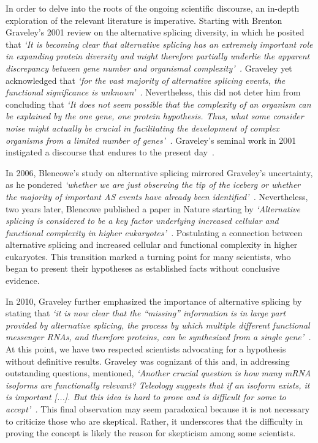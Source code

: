 In order to delve into the roots of the ongoing scientific discourse, an in-depth exploration of the relevant literature is imperative. Starting with Brenton Graveley's 2001 review on the alternative splicing diversity, in which he posited that \textit{`It is becoming clear that alternative splicing has an extremely important role in expanding protein diversity and might therefore partially underlie the apparent discrepancy between gene number and organismal complexity'~\citep{graveley_alternative_2001}.} Graveley yet acknowledged that \textit{`for the vast majority of alternative splicing events, the functional significance is unknown'~\citep{graveley_alternative_2001}.} Nevertheless, this did not deter him from concluding that \textit{`It does not seem possible that the complexity of an organism can be explained by the one gene, one protein hypothesis. Thus, what some consider noise might actually be crucial in facilitating the development of complex organisms from a limited number of genes'~\citep{graveley_alternative_2001}.} Graveley's seminal work in 2001 instigated a discourse that endures to the present day~\citep{graveley_alternative_2001}.

In 2006, Blencowe's study on alternative splicing mirrored Graveley's uncertainty, as he pondered \textit{`whether we are just observing the tip of the iceberg or whether the majority of important AS events have already been identified'~\citep{blencowe_alternative_2006}.} Nevertheless, two years later, Blencowe published a paper in Nature starting by \textit{`Alternative splicing is considered to be a key factor underlying increased cellular and functional complexity in higher eukaryotes'~\citep{pan_deep_2008}.} Postulating a connection between alternative splicing and increased cellular and functional complexity in higher eukaryotes. This transition marked a turning point for many scientists, who began to present their hypotheses as established facts without conclusive evidence.

In 2010, Graveley further emphasized the importance of alternative splicing by stating that \textit{`it is now clear that the “missing” information is in large part provided by alternative splicing, the process by which multiple different functional messenger RNAs, and therefore proteins, can be synthesized from a single gene'~\citep{nilsen_expansion_2010}.} At this point, we have two respected scientists advocating for a hypothesis without definitive results. Graveley was cognizant of this and, in addressing outstanding questions, mentioned, \textit{`Another crucial question is how many mRNA isoforms are functionally relevant? Teleology suggests that if an isoform exists, it is important [...]. But this idea is hard to prove and is difficult for some to accept'~\citep{nilsen_expansion_2010}.} This final observation may seem paradoxical because it is not necessary to criticize those who are skeptical. Rather, it underscores that the difficulty in proving the concept is likely the reason for skepticism among some scientists.

